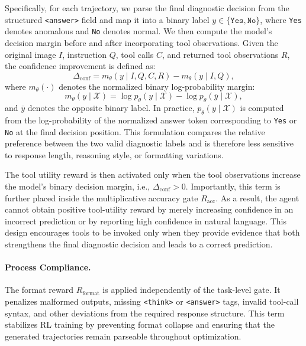 \documentclass{article}
\begin{document}
{Specifically, for each trajectory, we parse the final diagnostic decision from the structured \texttt{<answer>} field and map it into a binary label $y \in \{\texttt{Yes}, \texttt{No}\}$, where \texttt{Yes} denotes anomalous and \texttt{No} denotes normal. 
We then compute the model's decision margin before and after incorporating tool observations. 
Given the original image $I$, instruction $Q$, tool calls $C$, and returned tool observations $R$, the confidence improvement is defined as:
\begin{equation}
\Delta_{\text{conf}}
=
m_{\theta}(y \mid I, Q, C, R)
-
m_{\theta}(y \mid I, Q),
\end{equation}
where $m_{\theta}(\cdot)$ denotes the normalized binary log-probability margin:
\begin{equation}
m_{\theta}(y \mid \mathcal{X})
=
\log p_{\theta}(y \mid \mathcal{X})
-
\log p_{\theta}(\bar{y} \mid \mathcal{X}),
\end{equation}
and $\bar{y}$ denotes the opposite binary label. 
In practice, $p_{\theta}(y \mid \mathcal{X})$ is computed from the log-probability of the normalized answer token corresponding to \texttt{Yes} or \texttt{No} at the final decision position. 
This formulation compares the relative preference between the two valid diagnostic labels and is therefore less sensitive to response length, reasoning style, or formatting variations.

The tool utility reward is then activated only when the tool observations increase the model's binary decision margin, i.e., $\Delta_{\text{conf}}>0$. 
Importantly, this term is further placed inside the multiplicative accuracy gate $R_{\text{acc}}$. 
As a result, the agent cannot obtain positive tool-utility reward by merely increasing confidence in an incorrect prediction or by reporting high confidence in natural language. 
This design encourages tools to be invoked only when they provide evidence that both strengthens the final diagnostic decision and leads to a correct prediction.


\paragraph{Process Compliance.}
The format reward $R_{\text{format}}$ is applied independently of the task-level gate. 
It penalizes malformed outputs, missing \texttt{<think>} or \texttt{<answer>} tags, invalid tool-call syntax, and other deviations from the required response structure. 
This term stabilizes RL training by preventing format collapse and ensuring that the generated trajectories remain parseable throughout optimization.

}
\end{document}
